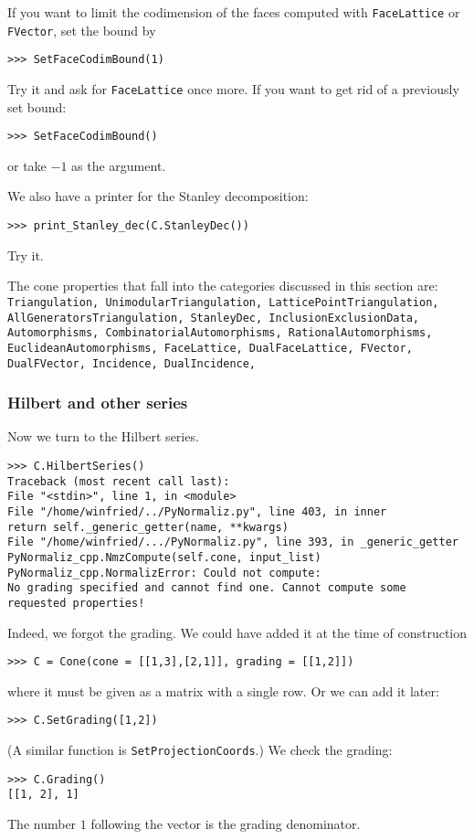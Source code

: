 \documentclass[12pt,a4paper]{scrartcl}
\theoremstyle{definition}
\def\ttt{\texttt}
\begin{document}
\begin{small}
If you want to limit the codimension of the faces computed with \verb|FaceLattice| or \verb|FVector|, set the bound by
\begin{Verbatim}
>>> SetFaceCodimBound(1)
\end{Verbatim}
Try it and ask for \verb|FaceLattice| once more. If you want to get rid of a previously set bound:
\begin{Verbatim}
>>> SetFaceCodimBound()
\end{Verbatim}
or take $-1$ as the argument.

We also have a printer for the Stanley decomposition:
\begin{Verbatim}
>>> print_Stanley_dec(C.StanleyDec())
\end{Verbatim}
Try it.

The cone properties that fall into the categories discussed in this section are: \ttt{    Triangulation,
	UnimodularTriangulation,
	LatticePointTriangulation,
	AllGeneratorsTriangulation,
	StanleyDec,
	InclusionExclusionData,
	Automorphisms,
	CombinatorialAutomorphisms,
	RationalAutomorphisms,
	EuclideanAutomorphisms,
	FaceLattice,
	DualFaceLattice,
	FVector,
	DualFVector,
	Incidence,
	DualIncidence,}

\subsubsection{Hilbert and other series}

Now we turn to the Hilbert series.
\begin{Verbatim}
>>> C.HilbertSeries()
Traceback (most recent call last):
File "<stdin>", line 1, in <module>
File "/home/winfried/../PyNormaliz.py", line 403, in inner
return self._generic_getter(name, **kwargs)
File "/home/winfried/.../PyNormaliz.py", line 393, in _generic_getter
PyNormaliz_cpp.NmzCompute(self.cone, input_list)
PyNormaliz_cpp.NormalizError: Could not compute: 
No grading specified and cannot find one. Cannot compute some requested properties!
\end{Verbatim}
Indeed, we forgot the grading. We could have added it at the time of construction
\begin{Verbatim}
>>> C = Cone(cone = [[1,3],[2,1]], grading = [[1,2]])
\end{Verbatim}
where it must be given as a matrix with a single row. Or we can add it later:
\begin{Verbatim}
>>> C.SetGrading([1,2])
\end{Verbatim}
(A similar function is \verb|SetProjectionCoords|.) We check the grading:
\begin{Verbatim}
>>> C.Grading()
[[1, 2], 1]
\end{Verbatim}
The number $1$ following the vector is the grading denominator.


\end{small}
\end{document}
